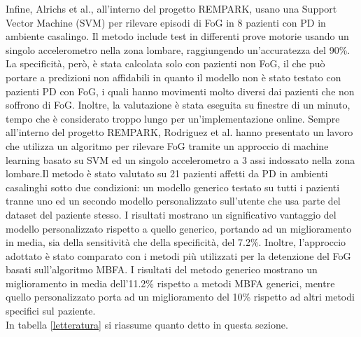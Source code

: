 Infine, Alrichs et al., all'interno del progetto REMPARK\cite{55}, usano una Support Vector Machine (SVM) per rilevare episodi di FoG in 8 pazienti con PD in ambiente casalingo. Il metodo include test in differenti prove motorie usando un singolo accelerometro nella zona lombare, raggiungendo un'accuratezza del 90\%. La specificità, però, è stata calcolata solo con pazienti non FoG, il che può portare a predizioni non affidabili in quanto il modello non è stato testato con pazienti PD con FoG, i quali hanno movimenti molto diversi dai pazienti che non soffrono di FoG. Inoltre, la valutazione è stata eseguita su finestre di un minuto, tempo che è considerato troppo lungo per un'implementazione online\cite{28}. Sempre all'interno del progetto REMPARK, Rodriguez et al. hanno presentato un lavoro che utilizza un algoritmo per rilevare FoG tramite un approccio di machine learning basato su SVM ed un singolo accelerometro a 3 assi indossato nella zona lombare\cite{HD}.Il metodo è stato valutato su 21 pazienti affetti da PD in ambienti casalinghi sotto due condizioni: un modello generico testato su tutti i pazienti tranne uno ed un secondo modello personalizzato sull'utente che usa parte del dataset del paziente stesso. I risultati mostrano un significativo vantaggio del modello personalizzato rispetto a quello generico, portando ad un miglioramento in media, sia della sensitività che della specificità, del 7.2\%. Inoltre, l'approccio adottato è stato comparato con i metodi più utilizzati per la detenzione del FoG basati sull'algoritmo MBFA. I risultati del metodo generico mostrano un miglioramento in media dell'11.2\% rispetto a metodi MBFA generici, mentre quello personalizzato porta ad un miglioramento del 10\% rispetto ad altri metodi specifici sul paziente.\\
In tabella \ref{letteratura} si riassume quanto detto in questa sezione.
